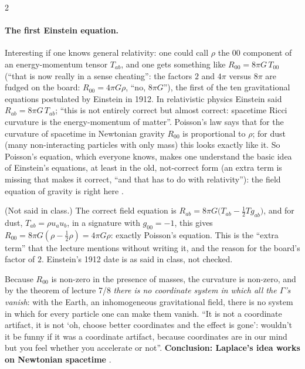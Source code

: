 \begin{paracol}{2}
\paragraph{The first Einstein equation.} Interesting if one knows general relativity: one could call $\rho$ the $00$ component of an energy-momentum tensor $T_{ab}$, and one gets something like $R_{00}=8\pi G\,T_{00}$ (``that is now really in a sense cheating'': the factors $2$ and $4\pi$ versus $8\pi$ are fudged on the board: $R_{00}=4\pi G\rho$, ``no, $8\pi G$''), the first of the ten gravitational equations postulated by Einstein in 1912. In relativistic physics Einstein said $R_{ab}=8\pi G\,T_{ab}$; ``this is not entirely correct but almost correct: spacetime Ricci curvature is the energy-momentum of matter''. Poisson's law says that for the curvature of spacetime in Newtonian gravity $R_{00}$ is proportional to $\rho$; for dust (many non-interacting particles with only mass) this looks exactly like it. So Poisson's equation, which everyone knows, makes one understand the basic idea of Einstein's equations, at least in the old, not-correct form (an extra term is missing that makes it correct, ``and that has to do with relativity''): the field equation of gravity is right here
.
\begin{coursenote}
(Not said in class.) The correct field equation is $R_{ab}=8\pi G\bigl(T_{ab}-\tfrac12Tg_{ab}\bigr)$, and for dust, $T_{ab}=\rho u_au_b$, in a signature with $g_{00}=-1$, this gives $R_{00}=8\pi G(\rho-\tfrac12\rho)=4\pi G\rho$: exactly Poisson's equation. This is the ``extra term'' that the lecture mentions without writing it, and the reason for the board's factor of $2$. Einstein's 1912 date is as said in class, not checked.
\end{coursenote}

Because $R_{00}$ is non-zero in the presence of masses, the curvature is non-zero, and by the theorem of lecture 7/8 \emph{there is no coordinate system in which all the $\Gamma$'s vanish}: with the Earth, an inhomogeneous gravitational field, there is no system in which for every particle one can make them vanish. ``It is not a coordinate artifact, it is not `oh, choose better coordinates and the effect is gone': wouldn't it be funny if it was a coordinate artifact, because coordinates are in our mind but you feel whether you accelerate or not''. \textbf{Conclusion: Laplace's idea works on Newtonian spacetime}
.


\end{paracol}
